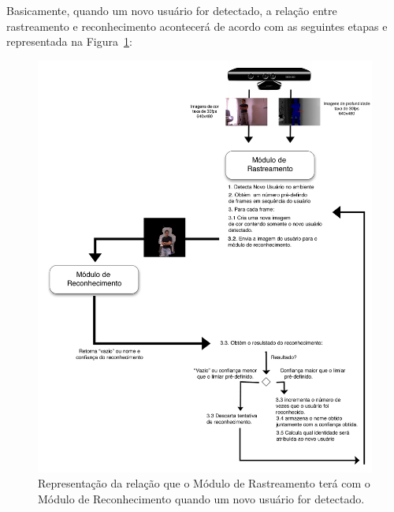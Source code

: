 	Basicamente, quando um novo usuário for detectado, a relação entre rastreamento e reconhecimento acontecerá de acordo com as seguintes etapas e representada na Figura~\ref{fig:rastreamento-reconhecimento}:

		\begin{figure}[hbt]
			\begin{center}
				\includegraphics[scale=1.5]{figuras/4.ProblemaEProposta/esquema-tracker-reco.png}
			\end{center}
			\caption{Representação da relação que o Módulo de Rastreamento terá com o Módulo de Reconhecimento quando um novo usuário for detectado.}
			\label{fig:rastreamento-reconhecimento}
		\end{figure}
	
